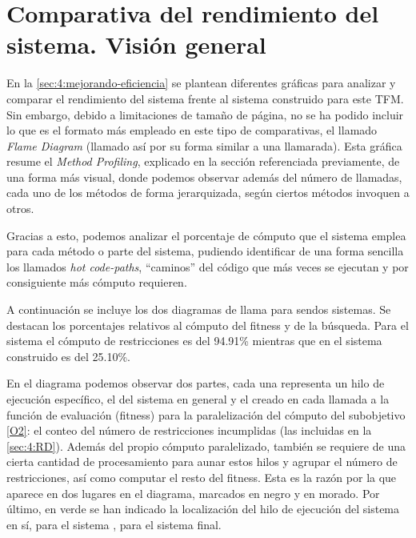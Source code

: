 \graphicspath{{anexos/AnexoC-Flame-Diagram/recursos/}}

\section{Comparativa del rendimiento del sistema. Visión general} \label{Anexo:flame-diagram}

En la \autoref{sec:4:mejorando-eficiencia} se plantean diferentes gráficas para analizar y comparar el rendimiento del sistema \legacy{} frente al sistema construido para este TFM. Sin embargo, debido a limitaciones de tamaño de página, no se ha podido incluir lo que es el formato más empleado en este tipo de comparativas, el llamado \textit{Flame Diagram} (llamado así por su forma similar a una llamarada). Esta gráfica resume el \textit{Method Profiling}, explicado en la sección referenciada previamente, de una forma más visual, donde podemos observar además del número de llamadas, cada uno de los métodos de forma jerarquizada, según ciertos métodos invoquen a otros.

Gracias a esto, podemos analizar el porcentaje de cómputo que el sistema emplea para cada método o parte del sistema, pudiendo identificar de una forma sencilla los llamados \textit{hot code-paths}, ``caminos'' del código que más veces se ejecutan y por consiguiente más cómputo requieren.

A continuación se incluye los dos diagramas de llama para sendos sistemas. Se destacan los porcentajes relativos al cómputo del fitness y de la búsqueda. Para el sistema \legacy{} el cómputo de restricciones es del 94.91\% mientras que en el sistema construido es del 25.10\%.

En el diagrama podemos observar dos partes, cada una representa un hilo de ejecución específico, el del sistema en general y el creado en cada llamada a la función de evaluación (fitness) para la paralelización del cómputo del subobjetivo \ref{O2}: el conteo del número de restricciones incumplidas (las incluidas en la \autoref{sec:4:RD}). Además del propio cómputo paralelizado, también se requiere de una cierta cantidad de procesamiento para aunar estos hilos y agrupar el número de restricciones, así como computar el resto del fitness. Esta es la razón por la que aparece en dos lugares en el diagrama, marcados en negro y en morado.
Por último, en verde se han indicado la localización del hilo de ejecución del sistema en sí, \sa{} para el sistema \legacy{}, \vns{} para el sistema final.

